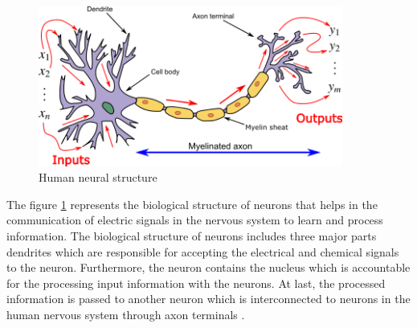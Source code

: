 \begin{figure}[!htp]
    \centering
    \includegraphics[width=10cm]{Images/neuron.png}
    \caption{Human neural structure}
    \label{figure:neuralStructure}
\end{figure}

The figure \ref{figure:neuralStructure} represents the biological structure of neurons that helps in the communication of electric signals in the nervous system to learn and process information. The biological structure of neurons
includes three major parts dendrites which are responsible for accepting the electrical and chemical signals to the neuron. 
Furthermore, the neuron contains the nucleus which is accountable for the processing input information with the neurons. 
At last, the processed information is passed to another neuron which is interconnected to neurons in the human nervous system through axon terminals
\citep{AGATONOVICKUSTRIN2000717}. 

